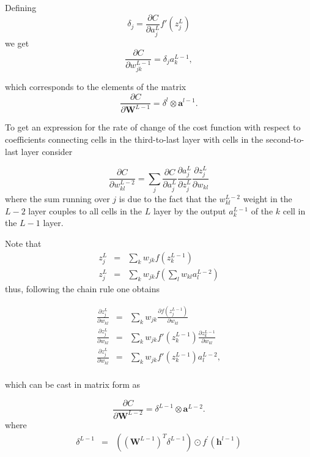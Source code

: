 \documentclass[11pt,onecolumn]{article}
\begin{document}
Defining 
\begin{equation}
    \delta_j = \frac{\partial C}{\partial a^{L}_j} f'(z^{L}_j)
\end{equation}
we get 
\begin{equation}
    \frac{\partial C}{\partial w^{L-1}_{jk}} =  \delta_j a^{L-1}_k ,
\end{equation}    

which corresponds to the elements of the matrix 
\begin{equation}
    \frac{\partial C}{\partial \mathbf{W}^{L-1}} = \delta^{l} \otimes \mathbf{a}^{l-1}. 
\end{equation}


To get an expression for the rate of change of the cost function with respect to coefficients 
connecting cells in the third-to-last layer with cells in the second-to-last layer consider 

\begin{equation}
    \frac{\partial C}{\partial w^{L-2}_{kl}} = \sum_j \frac{\partial C}{\partial a^{L}_j} 
                                               \frac{\partial a^{L}_j}{\partial z^{L}_j}
                                               \frac{\partial z^{L}_j}{\partial w_{kl} }
\end{equation}    
where the sum running over $j$ is due to the fact that the $ w^{L-2}_{kl} $ weight
in the $L-2$ layer couples to all cells in the $L$ layer by the output $a^{L-1}_k$ of the $k$ cell 
in the $L-1$ layer.   

Note that 
\begin{eqnarray}
    z^{L}_j &=& \sum_k w_{jk}f(z^{L-1}_k) \\ 
    z^{L}_j &=& \sum_k w_{jk}f(\sum_l w_{kl} a^{L-2}_l)
\end{eqnarray}    
thus, following the chain rule one obtains


\begin{eqnarray}
    \frac{\partial z^{L}_j}{\partial w_{kl} } &=& \sum_k w_{jk} \frac{\partial f(z^{L-1}_j)}{\partial  w_{kl}} \\
    \frac{\partial z^{L}_j}{\partial w_{kl} } &=& \sum_k w_{jk}  f'(z^{L-1}_k) \frac{\partial z^{L-1}_k}{\partial  w_{kl}} \\   
    \frac{\partial z^{L}_j}{\partial w_{kl} } &=& \sum_k w_{jk}  f'(z^{L-1}_k) a^{L-2}_l , \\
\end{eqnarray}

which can be cast in matrix form as 

\begin{equation}
    \frac{\partial C}{\partial \mathbf{W}^{L-2}} = \delta^{L-1} \otimes \mathbf{a}^{L-2}. 
\end{equation}
where
\begin{eqnarray}
    \delta^{L-1} &=& \left(\left(\mathbf{W}^{L-1}\right)^{T}\delta^{L-1} \right) \odot f^{'}\left( \mathbf{h}^{l-1}\right) 
\end{eqnarray}
\end{document}
